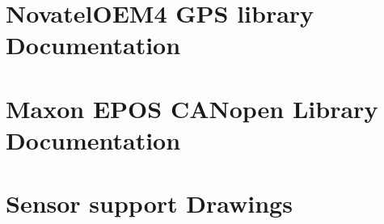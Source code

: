 \setcounter{page}{1}
\chapter{NovatelOEM4 GPS library Documentation}
\cleardoublepage
\pagestyle{empty}
\newlength{\originalVOffset}
\newlength{\originalHOffset}
\setlength{\originalVOffset}{\voffset}   
\setlength{\originalHOffset}{\hoffset}

\setlength{\voffset}{0cm}
\setlength{\hoffset}{0cm}
\label{appendix:novatel}

\cleardoublepage


\setcounter{page}{1}
\setlength{\voffset}{\originalVOffset}
\setlength{\hoffset}{\originalHOffset}
\chapter{Maxon EPOS CANopen Library Documentation}
\cleardoublepage
\setlength{\voffset}{0cm}
\setlength{\hoffset}{0cm}
\label{appendix:maxon}

\setlength{\voffset}{\originalVOffset}
\setlength{\hoffset}{\originalHOffset}
\cleardoublepage

\setcounter{page}{1}
\pagestyle{plain}
\setlength{\voffset}{\originalVOffset}
\setlength{\hoffset}{\originalHOffset}
\chapter{Sensor support Drawings}
\label{appendix:sensor_drawings}
\cleardoublepage

%


